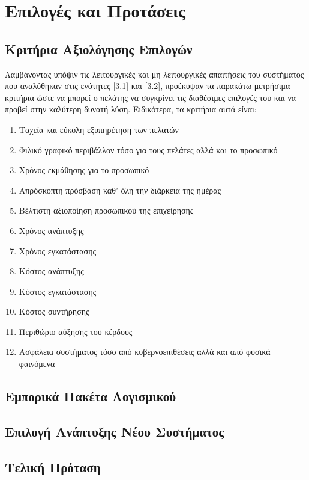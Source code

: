 \chapter{Επιλογές και Προτάσεις}
\section{Κριτήρια Αξιολόγησης Επιλογών}
Λαμβάνοντας υπόψιν τις λειτουργικές και μη λειτουργικές απαιτήσεις του συστήματος που αναλύθηκαν στις ενότητες \ref{3.1} και \ref{3.2},
προέκυψαν τα παρακάτω μετρήσιμα κριτήρια ώστε να μπορεί ο πελάτης να συγκρίνει τις διαθέσιμες επιλογές του και να προβεί στην καλύτερη 
δυνατή λύση. Ειδικότερα, τα κριτήρια αυτά είναι:
\begin{enumerate}
	\item Ταχεία και εύκολη εξυπηρέτηση των πελατών
	\item  Φιλικό γραφικό περιβάλλον τόσο για τους πελάτες αλλά και το προσωπικό
	\item  Χρόνος εκμάθησης για το προσωπικό
	\item Απρόσκοπτη πρόσβαση καθ’ όλη την διάρκεια της ημέρας
	\item Βέλτιστη αξιοποίηση προσωπικού της επιχείρησης
	\item Χρόνος ανάπτυξης
	\item Χρόνος εγκατάστασης
	\item Κόστος ανάπτυξης
	\item Κόστος εγκατάστασης
	\item Κόστος συντήρησης
	\item Περιθώριο αύξησης του κέρδους
	\item Ασφάλεια συστήματος τόσο από κυβερνοεπιθέσεις αλλά και από φυσικά φαινόμενα
\end{enumerate}

\section{Εμπορικά Πακέτα Λογισμικού}
\section{Επιλογή Ανάπτυξης Νέου Συστήματος}
\section{Τελική Πρόταση}

